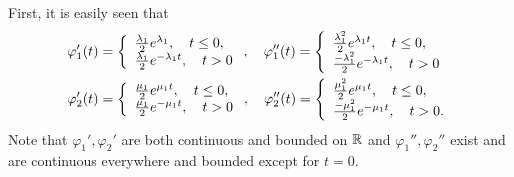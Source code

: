 \documentclass[12pt,letterpaper]{amsart}
\theoremstyle{definition}
\theoremstyle{remark}
\numberwithin{equation}{section}
\begin{document}
First, it is easily seen that
\begin{align*}
\varphi_{1}^{\prime}(t) &  =\left\{
\begin{array}
[c]{l}%
\frac{\lambda_{1}}{2}e^{\lambda_{1}},\quad t\leq0,\\
\frac{\lambda_{1}}{2}e^{-\lambda_{1}t},\quad t>0
\end{array}
\right.  ,\quad\varphi_{1}^{\prime\prime}(t)=\left\{
\begin{array}
[c]{l}%
\frac{\lambda_{1}^{2}}{2}e^{\lambda_{1}t},\quad t\leq0,\\
\frac{-\lambda_{1}^{2}}{2}e^{-\lambda_{1}t},\quad t>0
\end{array}
\right.  \\
\varphi_{2}^{\prime}(t) &  =\left\{
\begin{array}
[c]{l}%
\frac{\mu_{1}}{2}e^{\mu_{1}t},\quad t\leq0,\\
\frac{\mu_{1}}{2}e^{-\mu_{1}t},\quad t>0
\end{array}
\right.  ,\quad\varphi_{2}^{\prime\prime}(t)=\left\{
\begin{array}
[c]{l}%
\frac{\mu_{1}^{2}}{2}e^{\mu_{1}t},\quad t\leq0,\\
\frac{-\mu_{1}^{2}}{2}e^{-\mu_{1}t},\quad t>0 .
\end{array}
\right.
\end{align*}
Note that $\varphi_1', \varphi_2'$ are both continuous and bounded on $\mathbb R$ and $\varphi_1'', \varphi_2''$ exist and are continuous everywhere and bounded except for $t=0$.
\end{document}
